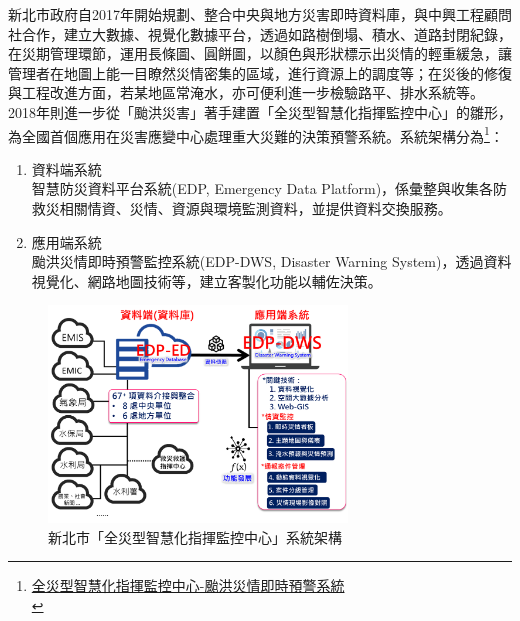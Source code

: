 \documentclass[a4paper,12pt]{article}
\begin{document}
\begin{enumerate}
\begin{enumerate}
新北市政府自2017年開始規劃、整合中央與地方災害即時資料庫，與中興工程顧問社合作，建立大數據、視覺化數據平台，透過如路樹倒塌、積水、道路封閉紀錄，在災期管理環節，運用長條圖、圓餅圖，以顏色與形狀標示出災情的輕重緩急，讓管理者在地圖上能一目瞭然災情密集的區域，進行資源上的調度等；在災後的修復與工程改進方面，若某地區常淹水，亦可便利進一步檢驗路平、排水系統等。\\
2018年則進一步從「颱洪災害」著手建置「全災型智慧化指揮監控中心」的雛形，為全國首個應用在災害應變中心處理重大災難的決策預警系統。系統架構分為\footnote{\href{http://smartcity.org.tw/application\_detail.php?id=62\&PHPSESSID=7mu78jtksuqe689dlia45c9fk6}{全災型智慧化指揮監控中心-颱洪災情即時預警系統}\\\label{org2a7ede8}}：\\
\begin{enumerate}
\item 資料端系統\\
智慧防災資料平台系統(EDP, Emergency Data Platform)，係彙整與收集各防救災相關情資、災情、資源與環境監測資料，並提供資料交換服務。\\
\item 應用端系統\\
颱洪災情即時預警監控系統(EDP-DWS, Disaster Warning System)，透過資料視覺化、網路地圖技術等，建立客製化功能以輔佐決策。\\
\end{enumerate}
\begin{figure}[htbp]
\centering
\includegraphics[width=300]{images/ITS.png}
\caption{\label{fig:FigName}新北市「全災型智慧化指揮監控中心」系統架構}
\end{figure}


\end{enumerate}
\end{enumerate}
\end{document}
